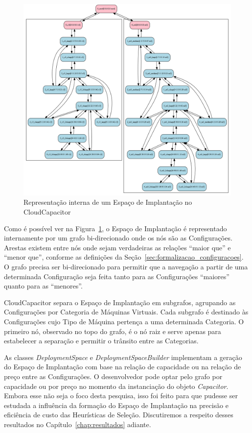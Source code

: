 \begin{figure}[htb]
  \caption{\label{fig:depspace_real}Representação interna de um Espaço de Implantação no CloudCapacitor}
  \begin{center}
    \includegraphics[scale=0.35]{img/exemplo_grafo_espaco_implantacao}
  \end{center}
\end{figure}

Como é possível ver na Figura~\ref{fig:depspace_real}, o Espaço de Implantação é 
representado internamente por um grafo bi-direcionado onde os nós são as 
Configurações. Arestas existem entre nós onde sejam verdadeiras as relações 
``maior que'' e ``menor que'', conforme as definições da 
Seção~\ref{sec:formalizacao_configuracoes}. O grafo precisa ser bi-direcionado 
para permitir que a navegação a partir de uma determinada Configuração seja feita 
tanto para as Configurações ``maiores'' quanto para as ``menores''.

CloudCapacitor separa o Espaço de Implantação em subgrafos, agrupando as
Configurações por Categoria de Máquinas Virtuais. Cada subgrafo é destinado às
Configurações cujo Tipo de Máquina pertença a uma determinada Categoria. O primeiro
nó, observado no topo do grafo, é o nó raiz e serve apenas para estabelecer a 
separação e permitir o trânsito entre as Categorias.

As classes \emph{DeploymentSpace} e \emph{DeploymentSpaceBuilder} implementam
a geração do Espaço de Implantação com base na relação de capacidade ou na relação
de preço entre as Configurações. O desenvolvedor pode optar pelo grafo por capacidade ou por preço no momento da
instanciação do objeto \emph{Capacitor}. Embora esse não seja o foco desta 
pesquisa, isso foi feito para que pudesse ser estudada a influência da formação 
do Espaço de Implantação na precisão e eficiência de custo das Heurísticas de 
Seleção. Discutiremos a respeito desses resultados no Capítulo~\ref{chap:resultados} 
adiante.

